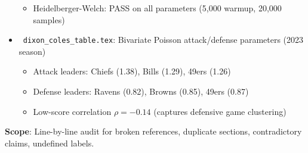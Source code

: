 \begin{itemize}
\begin{itemize}
    \item Heidelberger-Welch: PASS on all parameters (5,000 warmup, 20,000 samples)
  \end{itemize}
  \item \done\ \texttt{dixon\_coles\_table.tex}: Bivariate Poisson attack/defense parameters (2023 season)
  \begin{itemize}
    \item Attack leaders: Chiefs (1.38), Bills (1.29), 49ers (1.26)
    \item Defense leaders: Ravens (0.82), Browns (0.85), 49ers (0.87)
    \item Low-score correlation $\rho = -0.14$ (captures defensive game clustering)
  \end{itemize}
\end{itemize}

\textbf{Scope}: Line-by-line audit for broken references, duplicate sections, contradictory claims, undefined labels.

